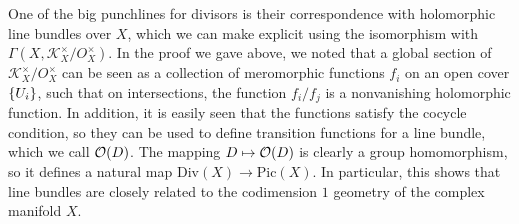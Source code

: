 %
One of the big punchlines for divisors is their correspondence with holomorphic
line bundles over $X$, which we can make explicit using the isomorphism with
$\Gamma(X, \mathcal{K}^\times_X / O^\times_X)$. In the proof we gave above, we noted
that a global section of $\mathcal{K}^\times_X / O^\times_X$ can be seen as a collection
of meromorphic functions $f_i$ on an open cover $\left\lbrace U_i \right\rbrace$, such that on intersections,
the function $f_i/f_j$ is a nonvanishing holomorphic function. In addition, it is easily
seen that the functions satisfy the cocycle condition, so they can be used
to define transition functions for a line bundle, which we call $\mathcal{O}(D)$. The
mapping $D \mapsto \mathcal{O}(D)$ is clearly a group homomorphism, so it defines a natural
map $\mathrm{Div}(X) \to \mathrm{Pic}(X)$. In particular, this shows that line bundles
are closely related to the codimension $1$ geometry of the complex manifold $X$.
%
%